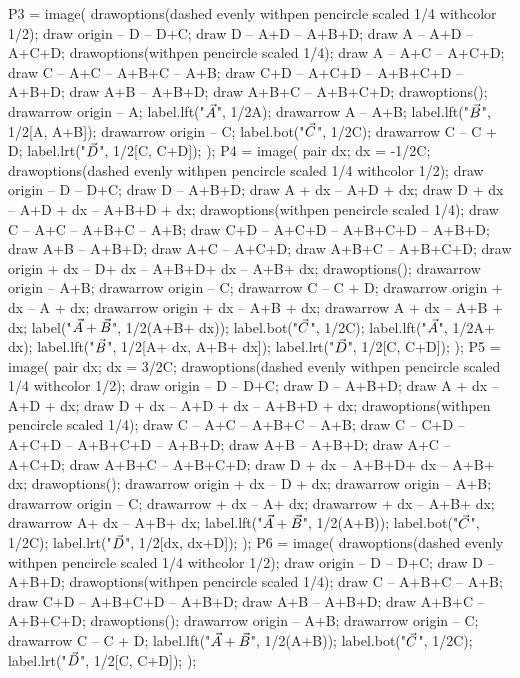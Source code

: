\documentclass[oneside]{scrbook}
\begin{document}
P3 = image(
  drawoptions(dashed evenly withpen pencircle scaled 1/4 withcolor 1/2);
  draw origin -- D -- D+C;  
  draw D -- A+D -- A+B+D;
  draw A -- A+D -- A+C+D;
  drawoptions(withpen pencircle scaled 1/4);
  draw A -- A+C -- A+C+D;
  draw C -- A+C -- A+B+C -- A+B;
  draw C+D -- A+C+D -- A+B+C+D -- A+B+D;
  draw A+B -- A+B+D;
  draw A+B+C -- A+B+C+D;
  drawoptions();
  drawarrow origin -- A; label.lft("$\vec{A}$", 1/2A);
  drawarrow A -- A+B; label.lft("$\vec{B}$", 1/2[A, A+B]);
  drawarrow origin -- C; label.bot("$\vec{C}$", 1/2C);
  drawarrow C -- C + D; label.lrt("$\vec{D}$", 1/2[C, C+D]);
);
P4 = image(
  pair dx; dx = -1/2C;
  drawoptions(dashed evenly withpen pencircle scaled 1/4 withcolor 1/2);
  draw origin -- D -- D+C;  
  draw D -- A+B+D;
  draw A + dx -- A+D + dx;
  draw D + dx -- A+D + dx -- A+B+D + dx;
  drawoptions(withpen pencircle scaled 1/4);
  draw C -- A+C -- A+B+C -- A+B;
  draw C+D -- A+C+D -- A+B+C+D -- A+B+D;
  draw A+B -- A+B+D;
  draw A+C -- A+C+D;
  draw A+B+C -- A+B+C+D;
  draw origin + dx -- D+ dx -- A+B+D+ dx -- A+B+ dx;
  drawoptions();
  drawarrow origin -- A+B;
  drawarrow origin -- C;
  drawarrow C -- C + D; 
  drawarrow origin + dx -- A + dx; 
  drawarrow origin + dx -- A+B + dx; 
  drawarrow A + dx -- A+B + dx;
  label("$\vec{A}+\vec{B}$", 1/2(A+B+ dx));
  label.bot("$\vec{C}$", 1/2C);
  label.lft("$\vec{A}$", 1/2A+ dx);
  label.lft("$\vec{B}$", 1/2[A+ dx, A+B+ dx]);
  label.lrt("$\vec{D}$", 1/2[C, C+D]);
);
P5 = image(
  pair dx; dx = 3/2C;
  drawoptions(dashed evenly withpen pencircle scaled 1/4 withcolor 1/2);
  draw origin -- D -- D+C;  
  draw D -- A+B+D;
  draw A + dx -- A+D + dx;
  draw D + dx -- A+D + dx -- A+B+D + dx;
  drawoptions(withpen pencircle scaled 1/4);
  draw C -- A+C -- A+B+C -- A+B;
  draw C -- C+D -- A+C+D -- A+B+C+D -- A+B+D;
  draw A+B -- A+B+D;
  draw A+C -- A+C+D;
  draw A+B+C -- A+B+C+D;
  draw D + dx -- A+B+D+ dx -- A+B+ dx;
  drawoptions();
  drawarrow origin + dx -- D + dx;
  drawarrow origin -- A+B;
  drawarrow origin -- C;
  drawarrow + dx -- A+ dx; 
  drawarrow + dx -- A+B+ dx; 
  drawarrow A+ dx -- A+B+ dx;
  label.lft("$\vec{A}+\vec{B}$", 1/2(A+B));
  label.bot("$\vec{C}$", 1/2C);
  label.lrt("$\vec{D}$", 1/2[dx, dx+D]);
);
P6 = image(
  drawoptions(dashed evenly withpen pencircle scaled 1/4 withcolor 1/2);
  draw origin -- D -- D+C;  draw D -- A+B+D;
  drawoptions(withpen pencircle scaled 1/4);
  draw C -- A+B+C -- A+B;
  draw C+D -- A+B+C+D -- A+B+D;
  draw A+B -- A+B+D;
  draw A+B+C -- A+B+C+D;
  drawoptions();
  drawarrow origin -- A+B;
  drawarrow origin -- C;
  drawarrow C -- C + D; 
  label.lft("$\vec{A}+\vec{B}$", 1/2(A+B));
  label.bot("$\vec{C}$", 1/2C);
  label.lrt("$\vec{D}$", 1/2[C, C+D]);
);
\end{document}

